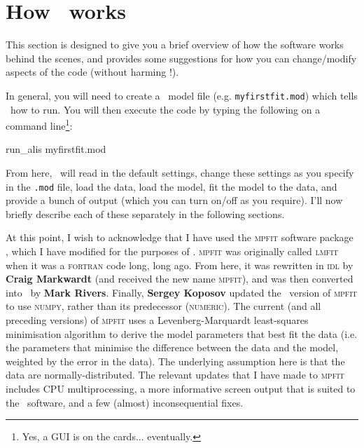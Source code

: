 \section{How \alis\ works}
\label{sec:description}

This section is designed to give you a brief overview of how
the software works behind the scenes, and provides some
suggestions for how you can change/modify aspects of
the code (without harming \alis!).

In general, you will need to create a \dmod\ model file
(e.g. \texttt{myfirstfit.mod}) which tells \alis\ how to run.
You will then execute the code by typing the following
on a command line\footnote{Yes, a GUI is on the cards... eventually.}:

\vspace{0.3cm}
\begin{mdframed}[style=MyFrame]
run\_alis myfirstfit.mod
\end{mdframed}
\vspace{0.2cm}

From here, \alis\ will read in the default settings, change these
settings as you specify in the \texttt{.mod} file, load the data,
load the model, fit the model to the data, and provide a bunch
of output (which you can turn on/off as you require). I'll now
briefly describe each of these separately in the following sections.

At this point, I wish to acknowledge that I have used the \textsc{mpfit}
software package \citep{Mar09}, which I have modified for the purposes
of \alis. \textsc{mpfit} was originally called \textsc{lmfit} when it was a
\textsc{fortran} code long, long ago. From here, it was rewritten in
\textsc{idl} by \textbf{Craig Markwardt} (and received the new name
\textsc{mpfit}), and was then converted into \python\ by \textbf{Mark Rivers}.
Finally, \textbf{Sergey Koposov} updated the \python\ version of \textsc{mpfit}
to use \textsc{numpy}, rather than its predecessor (\textsc{numeric}).
The current (and all preceding versions) of \textsc{mpfit} uses a
Levenberg-Marquardt least-squares minimisation algorithm to
derive the model parameters that best fit the data (i.e. the parameters
that minimise the difference between the data and the model, weighted
by the error in the data). The underlying assumption here is that the
data are normally-distributed. The relevant updates that I have
made to \textsc{mpfit} includes CPU multiprocessing, a more
informative screen output that is suited to the \alis\ software, and
a few (almost) inconsequential fixes.

